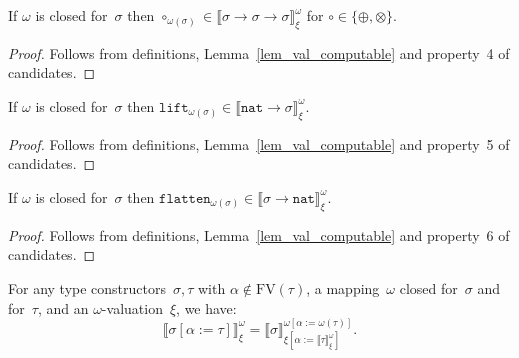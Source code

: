 \documentclass[runningheads,a4paper]{llncs}
\newcommand{\arrtype}{\rightarrow}
\newcommand{\subst}[2]{#1:=#2}
\newcommand{\FV}{\mathrm{FV}}
\newcommand{\nat}{\mathtt{nat}}
\newcommand{\flatten}{\mathtt{flatten}}
\newcommand{\lift}{\mathtt{lift}}
\newcommand{\val}[3]{\ensuremath{\llbracket#1\rrbracket_{#2}^{#3}}}
\begin{document}
\begin{lemma}\label{lem_circ}
  If $\omega$ is closed for~$\sigma$ then $\circ_{\omega(\sigma)} \in
  \val{\sigma \arrtype \sigma \arrtype \sigma}{\xi}{\omega}$ for
  $\circ \in \{ \oplus, \otimes \}$.
\end{lemma}

\begin{proof}
  Follows from definitions, Lemma~\ref{lem_val_computable} and
  property~4 of candidates.
\end{proof}

\begin{lemma}\label{lem_lift}
  If $\omega$ is closed for~$\sigma$ then $\lift_{\omega(\sigma)} \in
  \val{\nat\arrtype\sigma}{\xi}{\omega}$.
\end{lemma}

\begin{proof}
  Follows from definitions, Lemma~\ref{lem_val_computable} and
  property~5 of candidates.
\end{proof}

\begin{lemma}\label{lem_flatten}
  If $\omega$ is closed for~$\sigma$ then $\flatten_{\omega(\sigma)}
  \in \val{\sigma\arrtype\nat}{\xi}{\omega}$.
\end{lemma}

\begin{proof}
  Follows from definitions, Lemma~\ref{lem_val_computable} and
  property~6 of candidates.
\end{proof}

\begin{lemma}\label{lem_val_subst}
  For any type constructors~$\sigma,\tau$ with $\alpha \notin
  \FV(\tau)$, a mapping~$\omega$ closed for~$\sigma$ and for~$\tau$,
  and an $\omega$-valuation~$\xi$, we have:
  \[
  \val{\sigma[\subst{\alpha}{\tau}]}{\xi}{\omega} =
  \val{\sigma}{\xi[\subst{\alpha}{\val{\tau}{\xi}{\omega}}]}{\omega[\subst{\alpha}{\omega(\tau)}]}.
  \]
\end{lemma}
\end{document}
